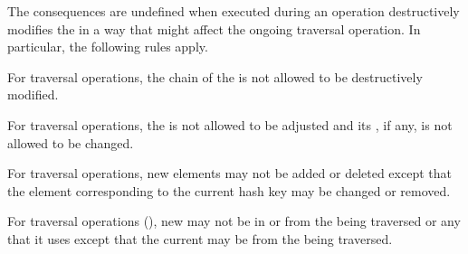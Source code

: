 
 
The consequences are undefined 
when  executed during an  operation
destructively modifies the  in a way that might affect the
ongoing traversal operation.
In particular, the following rules apply.
\beginlist
{}
 
 For  traversal operations, the  chain of the
  is not allowed to be destructively modified.
 

  For  traversal operations, the  is not allowed 
  to be adjusted and its , if any, is not allowed to 
  be changed.
 

  For  traversal operations, new elements may not be added
  or deleted except that the element corresponding to the current hash key 
  may be changed or removed.
 

  For  traversal operations (\eg {}),
  new  may not be  in or  
  from the  being traversed 
  or any  that it uses except that the 
  current  may be  from the  
  being traversed.

\endlist 

